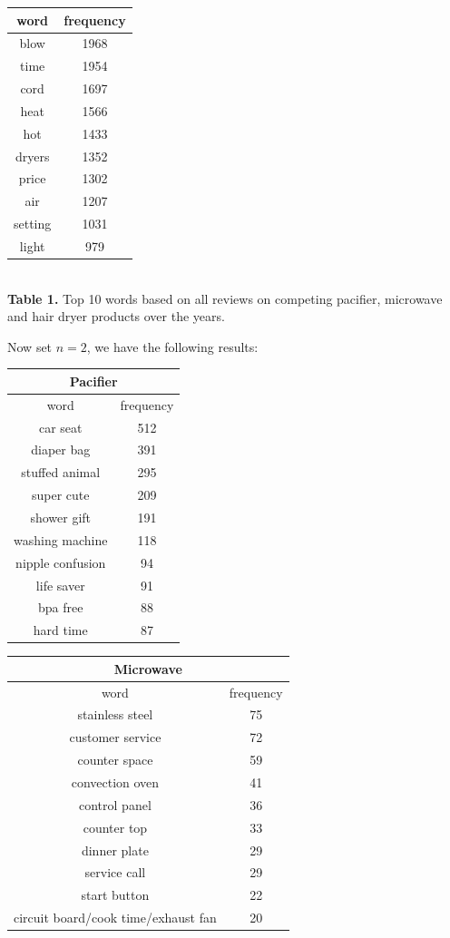 \documentclass[reqno]{article}
\theoremstyle{definition}
\theoremstyle{definition}
\theoremstyle{remark}
\begin{document}
\begin{center}
\begin{tabular}{|c|c|}
 word & frequency \\ 
 \hline
blow   &   1968 \\
time   &   1954 \\
cord   &   1697\\
heat   &   1566\\
hot    &   1433\\
dryers &   1352\\
price  &   1302\\
air    &   1207\\
setting  & 1031\\
light   &   979\\
 \hline
\end{tabular} \\
\bigskip
\textbf{Table 1.} Top 10 words based on all reviews on competing pacifier, microwave and hair dryer products over the years.
\end{center}
Now set $n = 2$, we have the following results:\\
\begin{center}
\begin{tabular}{|c|c|} 
 \hline
 \multicolumn{2}{|c|}{Pacifier} \\
 \hline
 word & frequency \\
  \hline
car seat    &    512 \\
diaper bag   &     391\\
stuffed animal   &   295\\
super cute    &    209\\
shower gift    &    191\\
washing  machine   &  118\\
nipple  confusion  &  94\\
life  saver   &     91\\
bpa free      &   88\\
hard time    &     87\\
 \hline
\end{tabular}
\begin{tabular}{|c|c|} 
 \hline
 \multicolumn{2}{|c|}{Microwave} \\
 \hline
 word & frequency \\ 
 \hline
stainless  steel     &   75\\
customer   service    &  72\\
counter    space    &    59\\
convection oven     &    41\\
control    panel    &    36\\
counter    top      &    33\\
 dinner     plate   &     29\\
service    call     &    29\\
 start      button  &     22\\
 circuit  board/cook   time/exhaust    fan     &     20\\
 \hline
\end{tabular}
\end{center}
\end{document}
